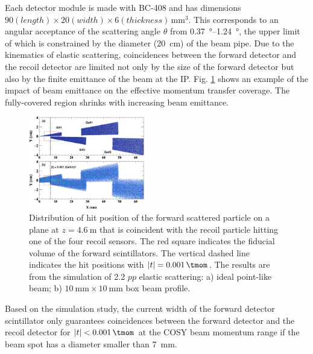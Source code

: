 \documentclass[number,5p]{elsarticle}
\begin{document}
Each detector module is made with BC-408 and has dimensions $90 (length) \times 20 (width) \times 6
(thickness)\,\si{\mm\tothe{3}}$.
This corresponds to an angular acceptance of the scattering angle $\theta$ from
\SIrange[range-units=repeat]{0.37}{1.24}{\degree}, the upper limit of which is
constrained by the diameter (\SI{20}{\cm}) of the beam pipe.
Due to the kinematics of elastic scattering, coincidences between the forward
detector and the recoil detector are limited not only by the size of the forward
detector but also by the finite emittance of the beam at the IP.
Fig. \ref{fig:forward_acceptance} shows an example of the impact of beam emittance on the
effective momentum transfer coverage.
The fully-covered region shrinks with increasing beam emittance. 
\begin{figure}[htb]
  \centering
  \includegraphics[width=0.45\textwidth]{./fwd_acceptance.png}
  \caption{
    Distribution of hit position of the forward scattered particle on a plane at
    $z=\SI{4.6}{\m}$ that is coincident with the recoil particle hitting one of
    the four recoil sensors.
    The red square indicates the fiducial volume of the forward scintillators.
    The vertical dashed line indicates the hit positions with $|t| = \SI{0.001}{\tmom}$.
    The results are from the simulation of \SI{2.2}{\momentum}
    $pp$ elastic scattering: a) ideal point-like beam; b) $\SI{10}{\mm}\times\SI{10}{\mm}$ box beam profile.
    }
  \label{fig:forward_acceptance}
\end{figure}
Based on the simulation study, the current width of the forward detector
scintillator only guarantees coincidences between the forward detector and the
recoil detector for $|t| < \SI{0.001}{\tmom}$ at the COSY beam momentum range if the beam spot has a diameter smaller than \SI{7}{\mm}.
\end{document}
